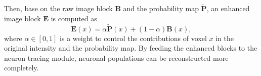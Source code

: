 Then, base on the raw image block $\mathbf{B}$ and the probability map $\widetilde{\mathbf{P}}$, an enhanced image block $\mathbf{E}$ is computed as
\begin{equation}
\mathbf{E}(x) = \alpha\widetilde{\mathbf{P}}(x) + (1-\alpha)\mathbf{B}(x),
\label{equ: enhance}
\end{equation}
where $\alpha\in [0,1]$ is a weight to control the contributions of voxel $ x $ in the original intensity and the probability map. By feeding the enhanced blocks to the neuron tracing module, neuronal populations can be reconstructed more completely.


